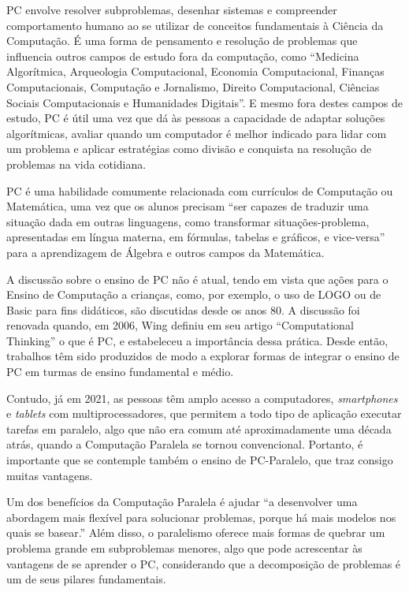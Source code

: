 \documentclass[conference]{IEEEtran}
\begin{document}
PC envolve resolver subproblemas, desenhar sistemas e compreender comportamento humano ao se utilizar de conceitos fundamentais à Ciência da Computação\cite{wing_computational_2006}. É uma forma de pensamento e resolução de problemas que influencia outros campos de estudo fora da computação, como ``Medicina Algorítmica, Arqueologia Computacional, Economia Computacional, Finanças Computacionais, Computação e Jornalismo, Direito Computacional, Ciências Sociais Computacionais e Humanidades Digitais''\cite{wing_computational_2010}. E mesmo fora destes campos de estudo, PC é útil uma vez que dá às pessoas a capacidade de adaptar soluções algorítmicas, avaliar quando um computador é melhor indicado para lidar com um problema e aplicar estratégias como divisão e conquista na resolução de problemas na vida cotidiana\cite{wing_computational_2010}.

PC é uma habilidade comumente relacionada com currículos de Computação\cite{tch060} ou Matemática, uma vez que os alunos precisam ``ser capazes de traduzir uma situação dada em outras linguagens, como transformar situações-problema, apresentadas em língua materna, em fórmulas, tabelas e gráficos, e vice-versa''\cite{ministerio_da_educacao_base_2018} para a aprendizagem de Álgebra e outros campos da Matemática. 

A discussão sobre o ensino de PC não é atual, tendo em vista que ações para o Ensino de Computação a crianças, como, por exemplo, o uso de LOGO ou de Basic para fins didáticos, são discutidas desde os anos 80\cite{grover_computational_2013}. A discussão foi renovada quando, em 2006, Wing definiu em seu artigo ``Computational Thinking'' o que é PC, e estabeleceu a importância dessa prática. Desde então, trabalhos têm sido produzidos de modo a explorar formas de integrar o ensino de PC em turmas de ensino fundamental e médio\cite{wing_computational_2006}\cite{de_franca_disseminacao_2014}\cite{repenning_computational_2016}\cite{monclar_jogos_nodate}.

Contudo, já em 2021, as pessoas têm amplo acesso a computadores, \textit{smartphones} e \textit{tablets} com multiprocessadores, que permitem a todo tipo de aplicação executar tarefas em paralelo, algo que não era comum até aproximadamente uma década atrás, quando a Computação Paralela se tornou convencional. Portanto, é importante que se contemple também o ensino de PC-Paralelo, que traz consigo muitas vantagens\cite{BBC}.

Um dos benefícios da Computação Paralela é ajudar ``a desenvolver uma abordagem mais flexível para solucionar problemas, porque há mais modelos nos quais se basear.''\cite{BBC} Além disso, o paralelismo oferece mais formas de quebrar um problema grande em subproblemas menores, algo que pode acrescentar às vantagens de se aprender o PC, considerando que a decomposição de problemas é um de seus pilares fundamentais\cite{BBC}.
\end{document}
